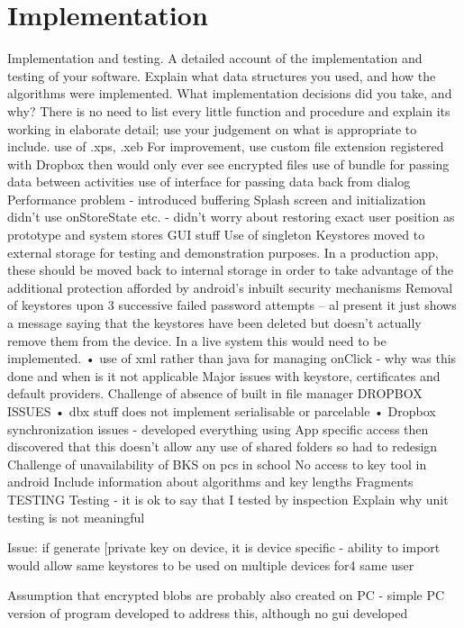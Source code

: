 
\chapter{Implementation}
\label{cha:imp}
Implementation and testing. A detailed account of the implementation and testing of your software. Explain what data structures you used, and how the algorithms were implemented. What implementation decisions did you take, and why? There is no need to list every little function and procedure and explain its working in elaborate detail; use your judgement on what is appropriate to include. 
use of .xps, .xeb
For improvement, use custom file extension registered with Dropbox then would only ever see encrypted files
use of bundle for passing data between activities
use of interface for passing data back from dialog
Performance problem - introduced buffering
Splash screen and initialization
didn't use onStoreState etc. - didn't worry about restoring exact user position as prototype and system stores GUI stuff
Use of singleton
Keystores moved to external storage for testing and demonstration purposes.  In a production app, these should be moved back to internal storage in order to take advantage of the additional protection afforded by android’s inbuilt security mechanisms
Removal of keystores upon 3 successive failed password attempts – al present it just shows a message saying that the keystores have been deleted but doesn’t actually remove them from the device.  In a live system this would need to be implemented.
• use of xml rather than java for managing onClick - why was this done and when is it not applicable
Major issues with keystore, certificates and default providers.
Challenge of absence of built in file manager
DROPBOX ISSUES
• dbx stuff does not implement serialisable or parcelable
• Dropbox synchronization issues - developed everything using App specific access then discovered that this doesn't allow any use of shared folders so had to redesign 
Challenge of unavailability of BKS on pcs in school
No access to key tool in android
Include information about algorithms and key lengths
Fragments
TESTING
Testing - it is ok to say that I tested by inspection
Explain why unit testing is not meaningful

Issue: if generate [private key on device, it is device specific - ability to import would allow same keystores to be used on multiple devices for4 same user

Assumption that encrypted blobs are probably also created on PC - simple PC version of program developed to address this, although no gui developed